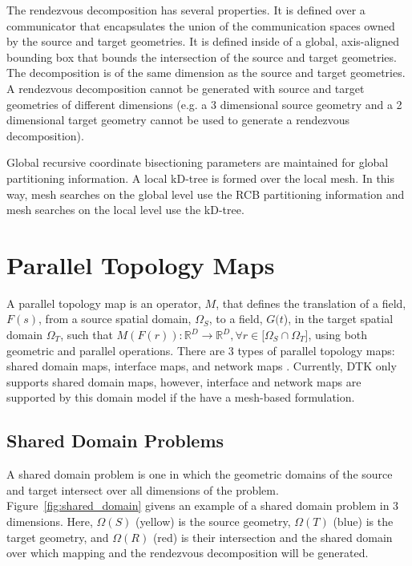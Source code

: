 \documentclass[letterpaper,12pt]{article}
\begin{document}
The rendezvous decomposition has several properties. It is defined
over a communicator that encapsulates the union of the communication
spaces owned by the source and target geometries. It is defined inside
of a global, axis-aligned bounding box that bounds the intersection of
the source and target geometries. The decomposition is of the same
dimension as the source and target geometries. A rendezvous
decomposition cannot be generated with source and target geometries of
different dimensions (e.g. a 3 dimensional source geometry and a 2
dimensional target geometry cannot be used to generate a rendezvous
decomposition). 

Global recursive coordinate bisectioning parameters
are maintained for global partitioning information. A local kD-tree is
formed over the local mesh. In this way, mesh searches on the global
level use the RCB partitioning information and mesh searches on the
local level use the kD-tree.

\clearpage

\section{Parallel Topology Maps}\label{sec:map}

A parallel topology map is an operator, $M$, that defines the
translation of a field, $F(s)$, from a source spatial domain,
$\Omega_S$, to a field, $G(t$), in the target spatial domain
$\Omega_T$, such that $M( F(r) ) : \mathbb{R}^D \rightarrow
\mathbb{R}^D, \forall r \in [\Omega_S \cap \Omega_T$], using both
geometric and parallel operations. There are 3 types of parallel
topology maps: shared domain maps, interface maps, and network maps
\cite{LIME_2011}. Currently, DTK only supports shared domain maps,
however, interface and network maps are supported by this domain model
if the have a mesh-based formulation.

\subsection{Shared Domain Problems}\label{subsec:shared_domain}
A shared domain problem is one in which the geometric domains of the
source and target intersect over all dimensions of the
problem. Figure~\ref{fig:shared_domain} givens an example of a shared
domain problem in 3 dimensions. Here, $\Omega(S)$ (yellow) is the
source geometry, $\Omega(T)$ (blue) is the target geometry, and
$\Omega(R)$ (red) is their intersection and the shared domain over
which mapping and the rendezvous decomposition will be generated.
\end{document}
